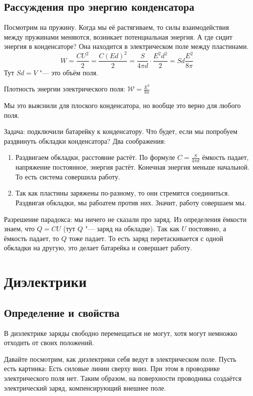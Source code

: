 
  \subsection{Рассуждения про энергию конденсатора}
      Посмотрим на пружину.
      Когда мы её растягиваем, то силы взаимодействия между пружинами
      меняются, возникает потенциальная энергия.
      А где сидит энергия в конденсаторе?
      Она находится в электрическом поле между пластинами.
      \[ W = \frac{CU^2}2 = \frac{C(Ed)^2}2 = \frac{S}{4\pi d}\cdot\frac{E^2d^2}{2} = Sd \frac{E^2}{8\pi} \]
      Тут $Sd=V$ "--- это объём поля. 
      \begin{Def}
        Плотность энергии электрического поля: $\mathcal{W} = \frac{E^2}{8\pi}$
      \end{Def}
      \begin{Rem}
        Мы это выяснили для плоского конденсатора, но вообще это верно для любого поля.
      \end{Rem}

      Задача: подключили батарейку к конденсатору.
      Что будет, если мы попробуем раздвинуть обкладки конденсатора?
      Два соображения:
      \begin{enumerate}
      \item Раздвигаем обкладки, расстояние растёт.
            По формуле $C=\frac{S}{4\pi d}$ ёмкость падает, напряжение постоянное, энергия растёт.
            Конечная энергия меньше начальной.
            То есть система совершила работу.
      \item Так как пластины заряжены по-разному, то они стремятся соединиться.
            Раздвигая обкладки, мы рабоатем против них.
            Значит, работу совершаем мы.
      \end{enumerate}
      Разрешение парадокса: мы ничего не сказали про заряд.
      Из определения ёмкости знаем, что $Q=CU$ (тут $Q$ "--- заряд на обкладке).
      Так как $U$ постоянно, а ёмкость падает, то $Q$ тоже падает.
      То есть заряд перетаскивается с одной обкладки на другую, это делает батарейка и совершает работу.

\section{Диэлектрики}
  \subsection{Определение и свойства}
    \begin{Def}
      В диэлектрике заряды свободно перемещаться не могут, хотя могут немножко отходить от своих положений.
    \end{Def}
    Давайте посмотрим, как диэлектрики себя ведут в электрическом поле.
    Пусть есть картинка:
    Есть силовые линии сверху вниз.
    При этом в проводнике электрического поля нет.
    Таким образом, на поверхности проводника создаётся электрический заряд, компенсирующий внешнее поле.

